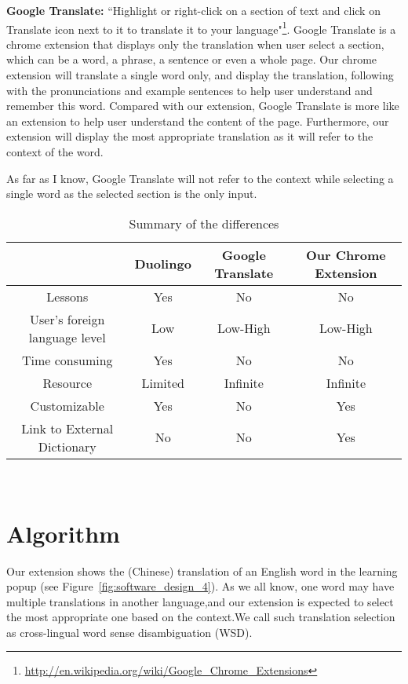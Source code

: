 \documentclass[11pt]{article}
\begin{document}
\textbf{Google Translate:} ``Highlight or right-click on a section of text and click on Translate icon next to it to translate it to your 
language"\footnote{\url{http://en.wikipedia.org/wiki/Google_Chrome_Extensions}}. %
Google Translate is a chrome extension that displays only the translation when user select a section, which can be a word, a phrase, a 
sentence or even a whole page. Our chrome extension will translate a single word only, and display the translation, following with the 
pronunciations and example sentences to help user understand and remember this word. Compared with our extension, Google Translate is more 
like an extension to help user understand the content of the page. Furthermore, our extension will display the most appropriate translation 
as it will refer to the context of the word.

As far as I know, Google Translate will not refer to the context while selecting a single word as the selected section is the only input.
\\
\begin{table}[ht]
  \caption{Summary of the differences}
  \label{table:difference_summary}
  \begin{center}
  \begin{tabular}{| c | c | c | c |}
    \hline
    & Duolingo & Google Translate & Our Chrome Extension \\
    \hline
    Lessons & Yes & No & No \\
    \hline
    User's foreign language level & Low & Low-High & Low-High \\
    \hline
    Time consuming & Yes & No & No\\
    \hline
    Resource & Limited & Infinite & Infinite \\
    \hline
    Customizable & Yes & No & Yes \\
    \hline
    Link to External Dictionary & No & No & Yes \\
    \hline
  \end{tabular}
  \end{center}
\end{table}
\\

\section{Algorithm}
Our extension shows the (Chinese) translation of an English word in the learning popup (see Figure~\ref{fig:software_design_4}). As we all know, one word may have multiple translations in another language,and our extension is expected to select the most appropriate one based on the context.We call such translation selection as cross-lingual word sense disambiguation (WSD).
\end{document}
